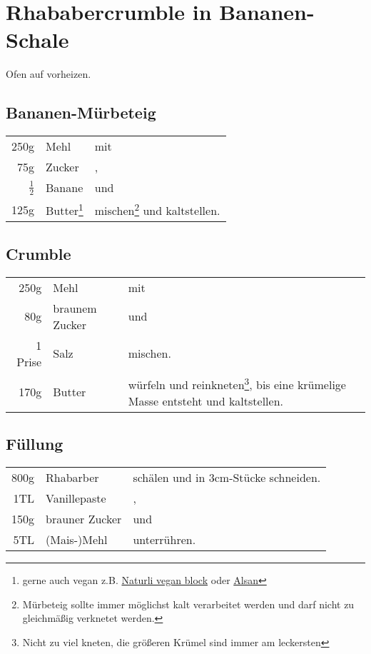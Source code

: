 \section{Rhababercrumble in Bananen-Schale}
Ofen auf  vorheizen.
\subsection*{Bananen-Mürbeteig}\label{subsec:banana_shortcrust}
\begin{longtable}{rlL{18.54cm}}
    250g            &   Mehl    &   mit \\
    75g             &   Zucker  &   ,   \\
    $\frac{1}{2}$   &   Banane  &   und \\
    125g            &   Butter\footnote{\label{foot:butter}gerne auch vegan z.B. \href{https://www.bio123.de/produkt/naturli/naturli-organic-vegan-block-200g}{Naturli vegan block}
                                    oder \href{https://www.alsan.de/alsan-bio/}{Alsan}}
                                &   mischen\footnote{Mürbeteig sollte immer möglichst kalt verarbeitet werden und darf nicht zu gleichmäßig verknetet werden.} und kaltstellen. \\
\end{longtable}

\subsection*{Crumble}\label{subsec:crumble}
\begin{longtable}{rlL{16.68cm}}
    250g    &   Mehl            &   mit \\
    80g     &   braunem Zucker  &   und \\
    1 Prise &   Salz            &   mischen. \\
    170g    &   Butter
                                &   würfeln und reinkneten\footnote{Nicht zu viel kneten, die größeren Krümel sind immer am leckersten}, bis eine krümelige Masse entsteht und kaltstellen.  \\
\end{longtable}

\subsection*{Füllung}\label{subsec:rhubarb-filling}
\begin{longtable}{rlL{17.23cm}}
    800g    &   Rhabarber       &   schälen und in 3cm-Stücke schneiden.    \\
    1TL     &   Vanillepaste    &   ,   \\
    150g    &   brauner Zucker  &   und \\
    5TL     &   (Mais-)Mehl     &   unterrühren.    \\
\end{longtable}

